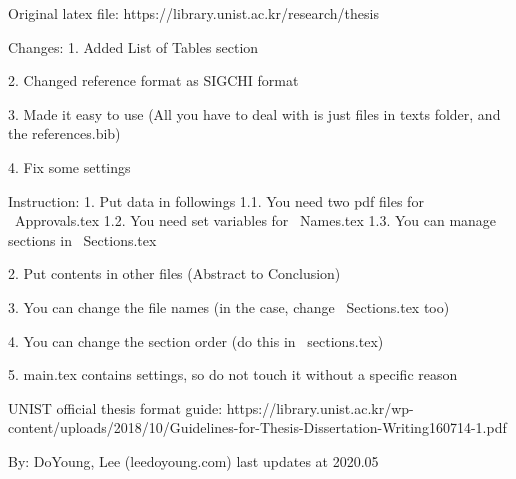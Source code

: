 Original latex file: https://library.unist.ac.kr/research/thesis

Changes:
1. Added List of Tables section

2. Changed reference format as SIGCHI format

3. Made it easy to use (All you have to deal with is just files in texts folder, and the references.bib)

4. Fix some settings

Instruction:
1. Put data in followings
 1.1. You need two pdf files for ~Approvals.tex
 1.2. You need set variables for ~Names.tex
 1.3. You can manage sections in ~Sections.tex

2. Put contents in other files (Abstract to Conclusion)

3. You can change the file names (in the case, change ~Sections.tex too)

4. You can change the section order (do this in ~sections.tex)

5. main.tex contains settings, so do not touch it without a specific reason


UNIST official thesis format guide:
https://library.unist.ac.kr/wp-content/uploads/2018/10/Guidelines-for-Thesis-Dissertation-Writing160714-1.pdf


By:
DoYoung, Lee (leedoyoung.com)
last updates at 2020.05
